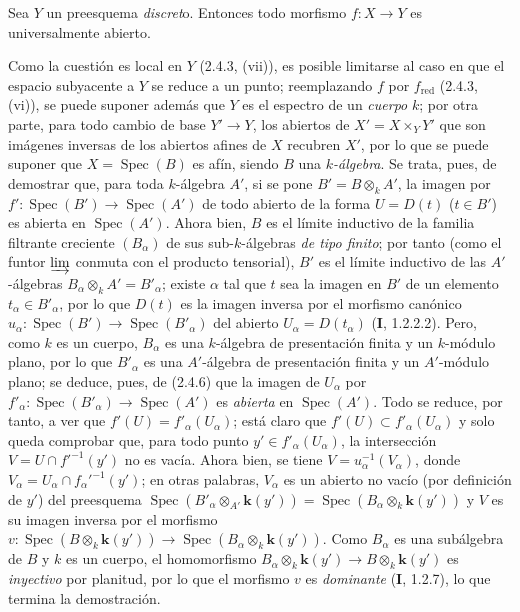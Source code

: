 \begin{proposition}[2.4.9]
\label{IV.2.4.9-fr}
Sea $Y$ un preesquema \emph{discret}o. Entonces todo morfismo $f:X\to Y$ es
universalmente abierto.
\end{proposition}

Como la cuestión es local en $Y$ (2.4.3, (vii)), es posible limitarse al caso
en que el espacio subyacente a $Y$ se reduce a un punto; reemplazando $f$ por
$f_{\mathrm{red}}$ (2.4.3, (vi)), se puede suponer además que $Y$ es el
espectro de un \emph{cuerpo} $k$; por otra parte, para todo cambio de base
$Y'\to Y$, los abiertos de $X'=X\times_Y Y'$ que son imágenes inversas de los
abiertos afines de $X$ recubren $X'$, por lo que se puede suponer que
$X=\operatorname{Spec}(B)$ es afín, siendo $B$ una \emph{$k$-álgebra}. Se trata,
pues, de demostrar que, para toda $k$-álgebra $A'$, si se pone
$B'=B\otimes_k A'$, la imagen por
$f':\operatorname{Spec}(B')\to\operatorname{Spec}(A')$ de todo abierto de la
forma $U=D(t)$ ($t\in B'$) es abierta en $\operatorname{Spec}(A')$. Ahora bien,
$B$ es el límite inductivo de la familia filtrante creciente $(B_\alpha)$ de
sus sub-$k$-álgebras \emph{de tipo finito}; por tanto (como el funtor
$\varinjlim$ conmuta con el producto tensorial), $B'$ es el límite inductivo
de las $A'$-álgebras $B_\alpha\otimes_k A'=B'_\alpha$; existe $\alpha$ tal que
$t$ sea la imagen en $B'$ de un elemento $t_\alpha\in B'_\alpha$, por lo que
$D(t)$ es la imagen inversa por el morfismo canónico
$u_\alpha:\operatorname{Spec}(B')\to\operatorname{Spec}(B'_\alpha)$ del
abierto $U_\alpha=D(t_\alpha)$ (\textbf I, 1.2.2.2). Pero, como $k$ es un cuerpo,
$B_\alpha$ es una $k$-álgebra de presentación finita y un $k$-módulo plano,
por lo que $B'_\alpha$ es una $A'$-álgebra de presentación finita y un
$A'$-módulo plano; se deduce, pues, de (2.4.6) que la imagen de $U_\alpha$ por
$f'_\alpha:\operatorname{Spec}(B'_\alpha)\to\operatorname{Spec}(A')$ es
\emph{abierta} en $\operatorname{Spec}(A')$. Todo se reduce, por tanto, a ver
que $f'(U)=f'_\alpha(U_\alpha)$; está claro que
$f'(U)\subset f'_\alpha(U_\alpha)$ y solo queda comprobar que, para todo punto
$y'\in f'_\alpha(U_\alpha)$, la intersección
$V=U\cap f'^{-1}(y')$ no es vacía. Ahora bien, se tiene
$V=u_\alpha^{-1}(V_\alpha)$, donde
$V_\alpha=U_\alpha\cap f_\alpha'^{-1}(y')$; en otras palabras, $V_\alpha$ es
un abierto no vacío (por definición de $y'$) del preesquema
$\operatorname{Spec}(B'_\alpha\otimes_{A'}\boldsymbol{k}(y'))
=\operatorname{Spec}(B_\alpha\otimes_k \boldsymbol{k}(y'))$
y $V$ es su imagen inversa por el morfismo
$v:\operatorname{Spec}(B\otimes_k \boldsymbol{k}(y'))
\longrightarrow\operatorname{Spec}(B_\alpha\otimes_k \boldsymbol{k}(y'))$.
Como $B_\alpha$ es una subálgebra de $B$ y $k$ es un cuerpo, el homomorfismo
$B_\alpha\otimes_k \boldsymbol{k}(y')\to B\otimes_k \boldsymbol{k}(y')$
es \emph{inyectivo} por planitud, por lo que el morfismo $v$ es \emph{dominante}
(\textbf I, 1.2.7), lo que termina la demostración.

